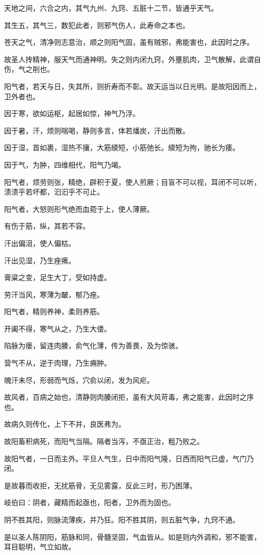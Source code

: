 \documentclass{article}%
\begin{document}
天地之间，六合之内，其气九州、九窍、五脏十二节，皆通乎天气。

其生五，其气三，数犯此者，则邪气伤人，此寿命之本也。

苍天之气，清净则志意治，顺之则阳气固，虽有贼邪，弗能害也，此因时之序。

故圣人抟精神，服天气而通神明。失之则内闭九窍，外壅肌肉，卫气散解，此谓自伤，气之削也。

阳气者，若天与日，失其所，则折寿而不彰。故天运当以日光明。是故阳因而上，卫外者也。

因于寒，欲如运枢，起居如惊，神气乃浮。

因于暑，汗，烦则喘喝，静则多言，体若燔炭，汗出而散。

因于湿，首如裹，湿热不攘，大筋緛短，小筋弛长。緛短为拘，驰长为痿。

因于气，为肿，四维相代，阳气乃竭。

阳气者，烦劳则张，精绝，辟积于夏，使人煎厥；目盲不可以视，耳闭不可以听，溃溃乎若坏都，汩汩乎不可止。

阳气者，大怒则形气绝而血菀于上，使人薄厥。

有伤于筋，纵，其若不容。

汗出偏沮，使人偏枯。

汗出见湿，乃生痤疿。

膏粱之变，足生大丁，受如持虚。

劳汗当风，寒薄为皶，郁乃痤。

阳气者，精则养神，柔则养筋。

开阖不得，寒气从之，乃生大偻。

陷脉为瘘，留连肉腠，俞气化薄，传为善畏，及为惊骇。

营气不从，逆于肉理，乃生痈肿。

魄汗未尽，形弱而气烁，穴俞以闭，发为风疟。

故风者，百病之始也，清静则肉腠闭拒，虽有大风苛毒，弗之能害，此因时之序也。

故病久则传化，上下不并，良医弗为。

故阳畜积病死，而阳气当隔。隔者当泻，不亟正治，粗乃败之。

故阳气者，一日而主外。平旦人气生，日中而阳气隆，日西而阳气已虚，气门乃闭。

是故暮而收拒，无扰筋骨，无见雾露，反此三时，形乃困薄。

岐伯曰：阴者，藏精而起亟也，阳者，卫外而为固也。

阴不胜其阳，则脉流薄疾，并乃狂。阳不胜其阴，则五脏气争，九窍不通。

是以圣人陈阴阳，筋脉和同，骨髓坚固，气血皆从。如是则内外调和，邪不能害，耳目聪明，气立如故。
\end{document}
